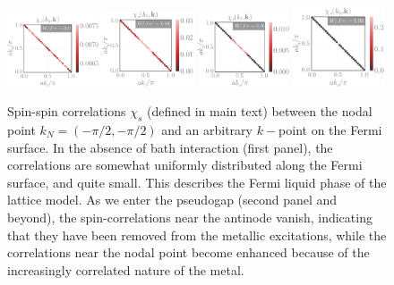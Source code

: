 \documentclass[reprint,hidelinks,onecolumn]{revtex4-2}
\begin{document}
\begin{figure}[htpb]
	\centering
	\includegraphics[width=0.24\textwidth]{tiledSF-1.pdf}
	\includegraphics[width=0.24\textwidth]{tiledSF-2.pdf}
	\includegraphics[width=0.24\textwidth]{tiledSF-3.pdf}
	\includegraphics[width=0.24\textwidth]{tiledSF-4.pdf}
	\caption{Spin-spin correlations \(\chi_s\) (defined in main text) between the nodal point \(k_N = \left( -\pi/2, -\pi/2\right)\) and an arbitrary \(k-\)point on the Fermi surface. In the absence of bath interaction (first panel), the correlations are somewhat uniformly distributed along the Fermi surface, and quite small. This describes the Fermi liquid phase of the lattice model. As we enter the pseudogap (second panel and beyond), the spin-correlations near the antinode vanish, indicating that they have been removed from the metallic excitations, while the correlations near the nodal point become enhanced because of the increasingly correlated nature of the metal.}
	\label{tiledSF}
\end{figure}
\end{document}
